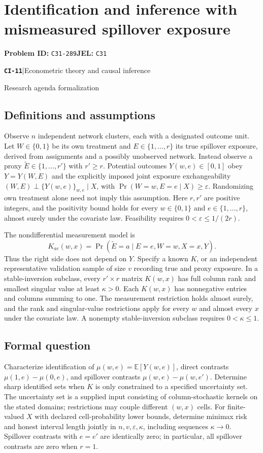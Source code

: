 \documentclass[11pt,a4paper]{article}
\newcommand{\E}{\mathbb E}
\newcommand{\entrymeta}[3]{{\sffamily\small\color{muted}\textbf{\texttt{#1}}\quad|\quad #2\par #3\par}}
\begin{document}
\section*{Identification and inference with mismeasured spillover exposure}
\textbf{Problem ID:} \texttt{C31-289}\quad \textbf{JEL:} \texttt{C31}\par
\label{problem:OP-0490}
\label{beyond:CI-11}
\entrymeta{CI-11}{Econometric theory and causal inference}{Research agenda formalization}
\subsection*{Definitions and assumptions}
Observe $n$ independent network clusters, each with a designated outcome unit. Let $W\in\{0,1\}$ be its own treatment and $E\in\{1,\ldots,r\}$ its true spillover exposure, derived from assignments and a possibly unobserved network. Instead observe a proxy $\widetilde E\in\{1,\ldots,r'\}$ with $r'\geq r$. Potential outcomes $Y(w,e)\in[0,1]$ obey $Y=Y(W,E)$ and the explicitly imposed joint exposure exchangeability
$(W,E)\perp\{Y(w,e)\}_{w,e}\mid X$, with $\Pr(W=w,E=e\mid X)\geq\varepsilon$.
Randomizing own treatment alone need not imply this assumption.
Here $r,r'$ are positive integers, and the positivity bound holds for every $w\in\{0,1\}$ and $e\in\{1,\ldots,r\}$, almost surely under the covariate law. Feasibility requires $0<\varepsilon\leq1/(2r)$.

The nondifferential measurement model is
\[
K_{ae}(w,x)=\Pr(\widetilde E=a\mid E=e,W=w,X=x,Y).
\]
Thus the right side does not depend on $Y$. Specify a known $K$, or an independent representative validation sample of size $v$ recording true and proxy exposure. In a stable-inversion subclass, every $r'\times r$ matrix $K(w,x)$ has full column rank and smallest singular value at least $\kappa>0$.
Each $K(w,x)$ has nonnegative entries and columns summing to one. The measurement restriction holds almost surely, and the rank and singular-value restrictions apply for every $w$ and almost every $x$ under the covariate law. A nonempty stable-inversion subclass requires $0<\kappa\leq1$.
\subsection*{Formal question}
Characterize identification of $\mu(w,e)=\E[Y(w,e)]$, direct contrasts $\mu(1,e)-\mu(0,e)$, and spillover contrasts $\mu(w,e)-\mu(w,e')$. Determine sharp identified sets when $K$ is only constrained to a specified uncertainty set. The uncertainty set is a supplied input consisting of column-stochastic kernels on the stated domains; restrictions may couple different $(w,x)$ cells. For finite-valued $X$ with declared cell-probability lower bounds, determine minimax risk and honest interval length jointly in $n,v,\varepsilon,\kappa$, including sequences $\kappa\to0$. Spillover contrasts with $e=e'$ are identically zero; in particular, all spillover contrasts are zero when $r=1$.
\end{document}
